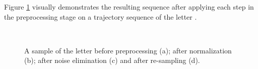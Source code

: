 \documentclass[10pt, conference, compsocconf]{IEEEtran}
\begin{document}
Figure \ref{fig:before_after_preprocessing} visually demonstrates the resulting sequence after applying each step in the preprocessing stage on a trajectory sequence of the letter . 

\begin{figure}
	\centering
          \\
    \caption{A sample of the letter  before preprocessing (a); after normalization (b); after noise elimination (c) and after re-sampling (d).}
   \label{fig:before_after_preprocessing}
\end{figure}
\end{document}
